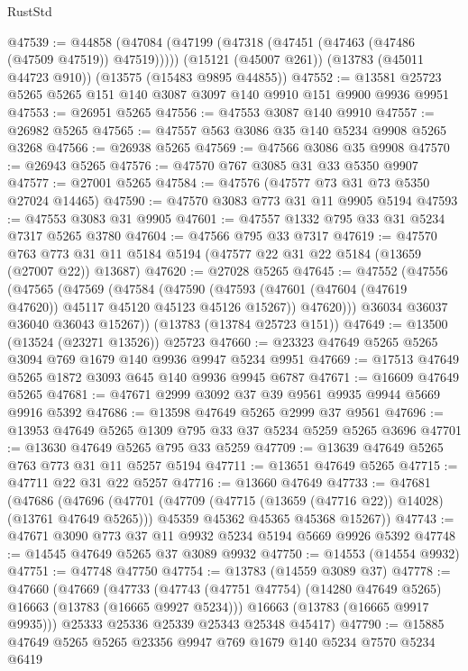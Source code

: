 \begin{lexlean}{RustStd}
\begin{coremodule}
@47539 := @44858
    (@47084 (@47199 (@47318 (@47451 (@47463 (@47486 (@47509 @47519)) @47519)))))
    (@15121 (@45007 @261))
    (@13783 (@45011 @44723 @910))
    (@13575 (@15483 @9895 @44855))
@47552 := @13581 @25723 @5265 @5265 @151 @140 @3087 @3097 @140 @9910 @151 @9900 @9936 @9951
@47553 := @26951 @5265
@47556 := @47553 @3087 @140 @9910
@47557 := @26982 @5265
@47565 := @47557 @563 @3086 @35 @140 @5234 @9908 @5265 @3268
@47566 := @26938 @5265
@47569 := @47566 @3086 @35 @9908
@47570 := @26943 @5265
@47576 := @47570 @767 @3085 @31 @33 @5350 @9907
@47577 := @27001 @5265
@47584 := @47576 (@47577 @73 @31 @73 @5350 @27024 @14465)
@47590 := @47570 @3083 @773 @31 @11 @9905 @5194
@47593 := @47553 @3083 @31 @9905
@47601 := @47557 @1332 @795 @33 @31 @5234 @7317 @5265 @3780
@47604 := @47566 @795 @33 @7317
@47619 := @47570
    @763
    @773
    @31
    @11
    @5184
    @5194
    (@47577 @22 @31 @22 @5184 (@13659 (@27007 @22)) @13687)
@47620 := @27028 @5265
@47645 := @47552
    (@47556
      (@47565
        (@47569
          (@47584
            (@47590
              (@47593 (@47601 (@47604 (@47619 @47620)) @45117 @45120 @45123 @45126 @15267))
              @47620)))
        @36034
        @36037
        @36040
        @36043
        @15267))
    (@13783 (@13784 @25723 @151))
@47649 := @13500 (@13524 (@23271 @13526)) @25723
@47660 := @23323 @47649 @5265 @5265 @3094 @769 @1679 @140 @9936 @9947 @5234 @9951
@47669 := @17513 @47649 @5265 @1872 @3093 @645 @140 @9936 @9945 @6787
@47671 := @16609 @47649 @5265
@47681 := @47671 @2999 @3092 @37 @39 @9561 @9935 @9944 @5669 @9916 @5392
@47686 := @13598 @47649 @5265 @2999 @37 @9561
@47696 := @13953 @47649 @5265 @1309 @795 @33 @37 @5234 @5259 @5265 @3696
@47701 := @13630 @47649 @5265 @795 @33 @5259
@47709 := @13639 @47649 @5265 @763 @773 @31 @11 @5257 @5194
@47711 := @13651 @47649 @5265
@47715 := @47711 @22 @31 @22 @5257
@47716 := @13660 @47649
@47733 := @47681
    (@47686
      (@47696
        (@47701 (@47709 (@47715 (@13659 (@47716 @22)) @14028) (@13761 @47649 @5265)))
        @45359
        @45362
        @45365
        @45368
        @15267))
@47743 := @47671 @3090 @773 @37 @11 @9932 @5234 @5194 @5669 @9926 @5392
@47748 := @14545 @47649 @5265 @37 @3089 @9932
@47750 := @14553 (@14554 @9932)
@47751 := @47748 @47750
@47754 := @13783 (@14559 @3089 @37)
@47778 := @47660
    (@47669
      (@47733
        (@47743 (@47751 @47754) (@14280 @47649 @5265) @16663 (@13783 (@16665 @9927 @5234)))
        @16663
        (@13783 (@16665 @9917 @9935)))
      @25333
      @25336
      @25339
      @25343
      @25348
      @45417)
@47790 := @15885 @47649 @5265 @5265 @23356 @9947 @769 @1679 @140 @5234 @7570 @5234 @6419

\end{coremodule}
\end{lexlean}
